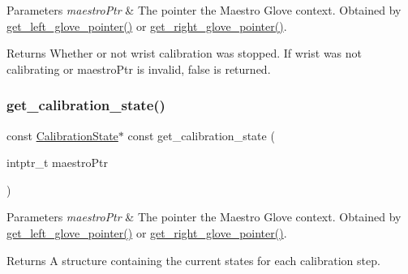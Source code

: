 \begin{DoxyParams}{Parameters}
{\em maestro\+Ptr} & The pointer the Maestro Glove context. Obtained by \hyperlink{group__glove_management_ga63ce3c99d4a8b8db851b22af9185764e}{get\+\_\+left\+\_\+glove\+\_\+pointer()} or \hyperlink{group__glove_management_ga9b8fd9d91aeac3f8da50f7a7eba0c32b}{get\+\_\+right\+\_\+glove\+\_\+pointer()}. \\
\hline
\end{DoxyParams}
\begin{DoxyReturn}{Returns}
Whether or not wrist calibration was stopped. If wrist was not calibrating or {\ttfamily maestro\+Ptr} is invalid, {\ttfamily false} is returned. 
\end{DoxyReturn}
\mbox{\label{group__glove_calibration_gabdcc329a1b06cd17988398aabbbb74c2}} 
\subsubsection{\texorpdfstring{get\+\_\+calibration\+\_\+state()}{get\_calibration\_state()}}
{\footnotesize\ttfamily const \hyperlink{struct_calibration_state}{Calibration\+State}$\ast$ const get\+\_\+calibration\+\_\+state (\begin{DoxyParamCaption}\item[{intptr\+\_\+t}]{maestro\+Ptr }\end{DoxyParamCaption})}


\begin{DoxyParams}{Parameters}
{\em maestro\+Ptr} & The pointer the Maestro Glove context. Obtained by \hyperlink{group__glove_management_ga63ce3c99d4a8b8db851b22af9185764e}{get\+\_\+left\+\_\+glove\+\_\+pointer()} or \hyperlink{group__glove_management_ga9b8fd9d91aeac3f8da50f7a7eba0c32b}{get\+\_\+right\+\_\+glove\+\_\+pointer()}. \\
\hline
\end{DoxyParams}
\begin{DoxyReturn}{Returns}
A structure containing the current states for each calibration step. 
\end{DoxyReturn}
\mbox{\label{group__glove_calibration_ga8aa9f0c942b42299bc16440ce3d2c785}} 
